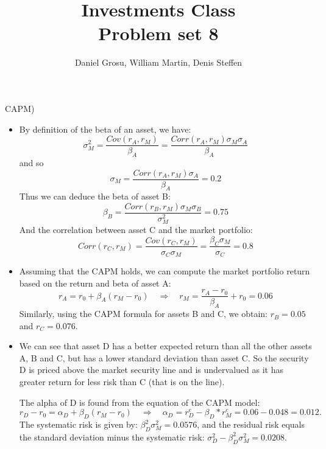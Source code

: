 \documentclass[10pt]{article}
\newenvironment{exercise}[2][Exercise]{\begin{trivlist}
  \item[\hskip \labelsep {\bfseries #1}\hskip \labelsep {\bfseries #2.}]}{\end{trivlist}}
\begin{document}
  \pagecolor{solar}
	
  \renewcommand{\qedsymbol}{\smiley}
	\title{Investments Class \\ Problem set 8}
	\author{Daniel Grosu, William Martin, Denis Steffen}
		
\maketitle

\begin{exercise}{1}(CAPM)
\end{exercise}
\begin{itemize}
  \item[(a)] By definition of the beta of an asset, we have: $$ \sigma_M^2 = \frac{Cov(r_A,r_M)}{\beta_A} = \frac{Corr(r_A,r_M)\sigma_M\sigma_A}{\beta_A}$$ and so $$ \sigma_M = \frac{Corr(r_A,r_M)\sigma_A}{\beta_A} = 0.2$$
  Thus we can deduce the beta of asset B: $$\beta_B = \frac{Corr(r_B,r_M)\sigma_M\sigma_B}{\sigma_M^2} = 0.75$$
  And the correlation between asset C and the market portfolio:
  $$Corr(r_C,r_M) = \frac{Cov(r_C,r_M)}{\sigma_C\sigma_M} = \frac{\beta_C\sigma_M}{\sigma_C}  = 0.8$$
  \item[(b)] Assuming that the CAPM holds, we can compute the market portfolio
    return based on the return and beta of asset A: 
  $$ r_A = r_0 + \beta_A(r_M-r_0) \quad \Rightarrow \quad r_M = \frac{r_A-r_0}{\beta_A} + r_0 = 0.06$$ 
  Similarly, using the CAPM formula for assets B and C, we obtain: $ r_B = 0.05$ and $r_C = 0.076$.
  \item[(c)] We can see that asset D has a better expected return than all the
    other assets A, B and C, but has a lower standard deviation than asset C. So
    the security D is priced above the market security line and is undervalued as it has greater return for less risk than C (that is on the line). 
  
  The alpha of D is found from the equation of the CAPM model: 
  $$ r_D - r_0 = \alpha_D + \beta_D(r_M-r_0) \quad \Rightarrow \quad \alpha_D = r_D^e -\beta_D*r_M^e = 0.06 - 0.048 = 0.012.$$ 
  The systematic risk is given by: $\beta_D^2\sigma_M^2 = 0.0576$, and the residual risk equals the standard deviation minus the systematic risk: $\sigma_D^2-\beta_D^2\sigma_M^2 = 0.0208.$


\end{itemize}
\end{document}
